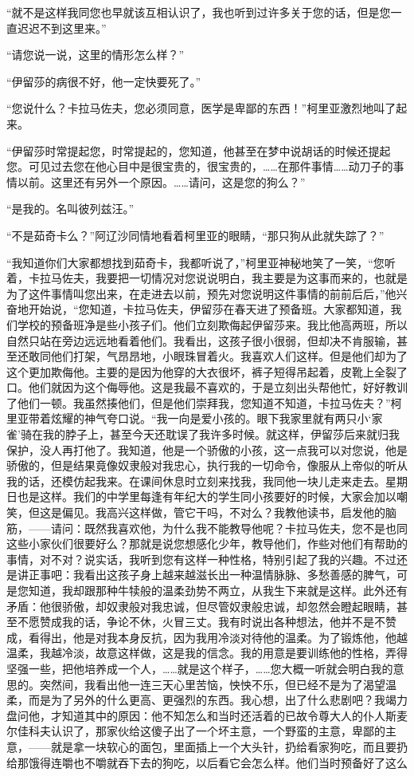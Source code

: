 \par “就不是这样我同您也早就该互相认识了，我也听到过许多关于您的话，但是您一直迟迟不到这里来。”
\par “请您说一说，这里的情形怎么样？”
\par “伊留莎的病很不好，他一定快要死了。”
\par “您说什么？卡拉马佐夫，您必须同意，医学是卑鄙的东西！”柯里亚激烈地叫了起来。
\par “伊留莎时常提起您，时常提起的，您知道，他甚至在梦中说胡话的时候还提起您。可见过去您在他心目中是很宝贵的，很宝贵的，……在那件事情……动刀子的事情以前。这里还有另外一个原因。……请问，这是您的狗么？”
\par “是我的。名叫彼列兹汪。”
\par “不是茹奇卡么？”阿辽沙同情地看着柯里亚的眼睛，“那只狗从此就失踪了？”
\par “我知道你们大家都想找到茹奇卡，我都听说了，”柯里亚神秘地笑了一笑，“您听着，卡拉马佐夫，我要把一切情况对您说说明白，我主要是为这事而来的，也就是为了这件事情叫您出来，在走进去以前，预先对您说明这件事情的前前后后，”他兴奋地开始说，“您知道，卡拉马佐夫，伊留莎在春天进了预备班。大家都知道，我们学校的预备班净是些小孩子们。他们立刻欺侮起伊留莎来。我比他高两班，所以自然只站在旁边远远地看着他们。我看出，这孩子很小很弱，但却决不肯服输，甚至还敢同他们打架，气昂昂地，小眼珠冒着火。我喜欢人们这样。但是他们却为了这个更加欺侮他。主要的是因为他穿的大衣很坏，裤子短得吊起着，皮靴上全裂了口。他们就因为这个侮辱他。这是我最不喜欢的，于是立刻出头帮他忙，好好教训了他们一顿。我虽然揍他们，但是他们崇拜我，您知道不知道，卡拉马佐夫？”柯里亚带着炫耀的神气夸口说。“我一向是爱小孩的。眼下我家里就有两只小‘家雀’骑在我的脖子上，甚至今天还耽误了我许多时候。就这样，伊留莎后来就归我保护，没人再打他了。我知道，他是一个骄傲的小孩，这一点我可以对您说，他是骄傲的，但是结果竟像奴隶般对我忠心，执行我的一切命令，像服从上帝似的听从我的话，还模仿起我来。在课间休息时立刻来找我，我同他一块儿走来走去。星期日也是这样。我们的中学里每逢有年纪大的学生同小孩要好的时候，大家会加以嘲笑，但这是偏见。我高兴这样做，管它干吗，不对么？我教他读书，启发他的脑筋，——请问：既然我喜欢他，为什么我不能教导他呢？卡拉马佐夫，您不是也同这些小家伙们很要好么？那就是说您想感化少年，教导他们，作些对他们有帮助的事情，对不对？说实话，我听到您有这样一种性格，特别引起了我的兴趣。不过还是讲正事吧：我看出这孩子身上越来越滋长出一种温情脉脉、多愁善感的脾气，可是您知道，我却跟那种牛犊般的温柔劲势不两立，从我生下来就是这样。此外还有矛盾：他很骄傲，却奴隶般对我忠诚，但尽管奴隶般忠诚，却忽然会瞪起眼睛，甚至不愿赞成我的话，争论不休，火冒三丈。我有时说出各种想法，他并不是不赞成，看得出，他是对我本身反抗，因为我用冷淡对待他的温柔。为了锻炼他，他越温柔，我越冷淡，故意这样做，这是我的信念。我的用意是要训练他的性格，弄得坚强一些，把他培养成一个人，……就是这个样子，……您大概一听就会明白我的意思的。突然间，我看出他一连三天心里苦恼，怏怏不乐，但已经不是为了渴望温柔，而是为了另外的什么更高、更强烈的东西。我心想，出了什么悲剧吧？我竭力盘问他，才知道其中的原因：他不知怎么和当时还活着的已故令尊大人的仆人斯麦尔佳科夫认识了，那家伙给这傻子出了一个坏主意，一个野蛮的主意，卑鄙的主意，——就是拿一块软心的面包，里面插上一个大头针，扔给看家狗吃，而且要扔给那饿得连嚼也不嚼就吞下去的狗吃，以后看它会怎么样。他们当时预备好了这么